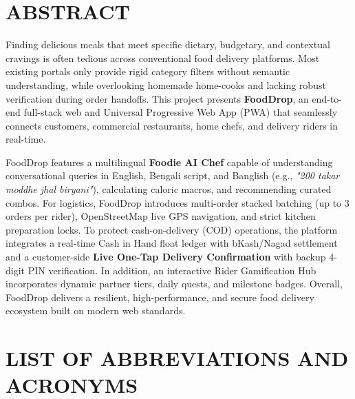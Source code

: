 \documentclass[12pt,a4paper]{report}
\begin{document}
\chapter*{ABSTRACT}

Finding delicious meals that meet specific dietary, budgetary, and contextual cravings is often tedious across conventional food delivery platforms. Most existing portals only provide rigid category filters without semantic understanding, while overlooking homemade home-cooks and lacking robust verification during order handoffs. This project presents \textbf{FoodDrop}, an end-to-end full-stack web and Universal Progressive Web App (PWA) that seamlessly connects customers, commercial restaurants, home chefs, and delivery riders in real-time.

FoodDrop features a multilingual \textbf{Foodie AI Chef} capable of understanding conversational queries in English, Bengali script, and Banglish (e.g., \textit{"200 takar moddhe jhal biryani"}), calculating caloric macros, and recommending curated combos. For logistics, FoodDrop introduces multi-order stacked batching (up to 3 orders per rider), OpenStreetMap live GPS navigation, and strict kitchen preparation locks. To protect cash-on-delivery (COD) operations, the platform integrates a real-time Cash in Hand float ledger with bKash/Nagad settlement and a customer-side \textbf{Live One-Tap Delivery Confirmation} with backup 4-digit PIN verification. In addition, an interactive Rider Gamification Hub incorporates dynamic partner tiers, daily quests, and milestone badges. Overall, FoodDrop delivers a resilient, high-performance, and secure food delivery ecosystem built on modern web standards.

\newpage

{}
\listoffigures

\newpage
{}
{}
\listoftables

\newpage

\chapter*{LIST OF ABBREVIATIONS AND ACRONYMS}
\end{document}
